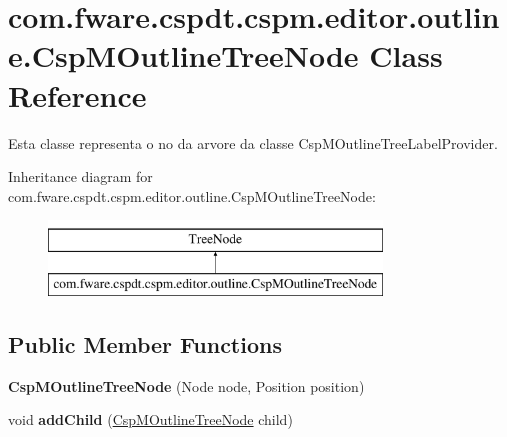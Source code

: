 \hypertarget{classcom_1_1fware_1_1cspdt_1_1cspm_1_1editor_1_1outline_1_1_csp_m_outline_tree_node}{}\section{com.\+fware.\+cspdt.\+cspm.\+editor.\+outline.\+Csp\+M\+Outline\+Tree\+Node Class Reference}
\label{classcom_1_1fware_1_1cspdt_1_1cspm_1_1editor_1_1outline_1_1_csp_m_outline_tree_node}


Esta classe representa o no da arvore da classe Csp\+M\+Outline\+Tree\+Label\+Provider.  


Inheritance diagram for com.\+fware.\+cspdt.\+cspm.\+editor.\+outline.\+Csp\+M\+Outline\+Tree\+Node\+:\begin{figure}[H]
\begin{center}
\leavevmode
\includegraphics[height=2.000000cm]{classcom_1_1fware_1_1cspdt_1_1cspm_1_1editor_1_1outline_1_1_csp_m_outline_tree_node}
\end{center}
\end{figure}
\subsection*{Public Member Functions}
\begin{DoxyCompactItemize}
\item 
\mbox{\label{classcom_1_1fware_1_1cspdt_1_1cspm_1_1editor_1_1outline_1_1_csp_m_outline_tree_node_ae906802314a97d4072e3a0121f001540}} 
{\bfseries Csp\+M\+Outline\+Tree\+Node} (Node node, Position position)
\item 
\mbox{\label{classcom_1_1fware_1_1cspdt_1_1cspm_1_1editor_1_1outline_1_1_csp_m_outline_tree_node_a161f2d780e4ede63cf90f68eecb407bc}} 
void {\bfseries add\+Child} (\hyperlink{classcom_1_1fware_1_1cspdt_1_1cspm_1_1editor_1_1outline_1_1_csp_m_outline_tree_node}{Csp\+M\+Outline\+Tree\+Node} child)
\end{DoxyCompactItemize}
